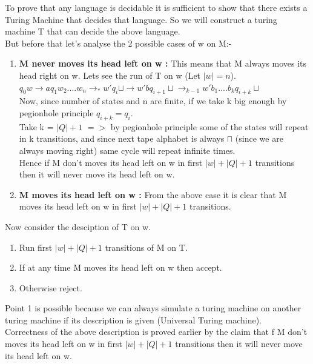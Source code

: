 \documentclass{article}
\begin{document}
To prove that any language is decidable it is sufficient to show that there exists a Turing Machine that 
decides that language. So we will construct a turing machine T that can decide the above language.\\
But before that let's analyse the 2 possible cases of w on M:-

\begin{enumerate}
    \item \textbf{M never moves its head left on w :}
    This means that M always moves its head right on w. Lets see the run of T on w (Let $|w| = n$).\\
    $q_0w \rightarrow aq_1w_2....w_n \rightarrow_* w'q_i \sqcup \rightarrow w' b q_{i+1} \sqcup \rightarrow_{k-1} w' b_1....b_k q_{i+k} \sqcup   $\\
    Now, since number of states and n are finite, if we take k big enough by pegionhole principle $q_{i+k} = q_i$.\\
    Take k = $|Q|+1$ $=>$ by pegionhole principle some of the states will repeat in k transitions, and since next tape alphabet 
    is always $\sqcap$ (since we are always moving right) same cycle will repeat infinite times.\\
    Hence if M don't moves its head left on w in first $|w| + |Q| + 1$ transitions then it will never move its head left on w.\\

    \item \textbf{M moves its head left on w :}
    From the above case it is clear that M moves its head left on w in first $|w| + |Q| + 1$ transitions.\\
    
\end{enumerate}

Now consider the desciption of T on w.\\
\begin{enumerate}
    \item Run first $|w| + |Q| + 1$ transitions of M on T.
    \item If at any time M moves its head left on w then accept.
    \item Otherwise reject.
\end{enumerate}


Point 1 is possible because we can always simulate a turing machine on another turing machine if its description is given (Universal Turing machine).\\
Correctness of the above description is proved earlier by the claim that f M don't moves its head left on w in first $|w| + |Q| + 1$ transitions then it will never move its head left on w.\\
\pagebreak
\end{document}
